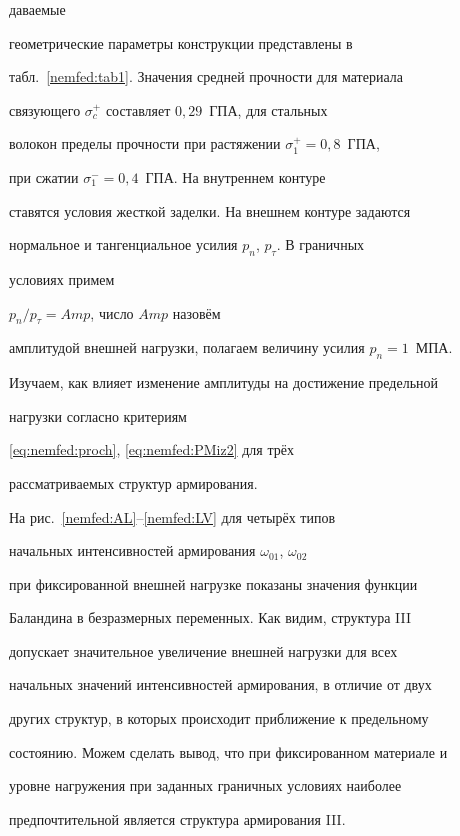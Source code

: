 \noindent даваемые

геометрические параметры конструкции представлены в

табл.~\ref{nemfed:tab1}. Значения средней прочности  для материала

связующего $\sigma_{c}^{+}$ составляет $0,29$~ГПА, для стальных

волокон пределы прочности при растяжении $\sigma_{1}^{+}=0,8$~ГПА,

при сжатии  $\sigma_{1}^{-}=0,4$~ГПА. На внутреннем контуре

ставятся условия жесткой заделки. На внешнем контуре задаются

нормальное и тангенциальное усилия $p_n$, $p_\tau$. В граничных

условиях примем 

 ${p_n}/{p_\tau}=Amp$, число $Amp $ назовём

амплитудой внешней нагрузки, полагаем величину усилия $p_n=1$~МПА.

Изучаем, как влияет изменение амплитуды на достижение предельной

нагрузки согласно критериям

\eqref{eq:nemfed:proch}, \eqref{eq:nemfed:PMiz2} для трёх

рассматриваемых структур армирования.













На рис.~\ref{nemfed:AL}--\ref{nemfed:LV} для четырёх типов

начальных интенсивностей армирования $\omega_{01}$, $\omega_{02}$

при фиксированной внешней нагрузке показаны значения функции

Баландина  в безразмерных переменных. Как видим, структура III

допускает значительное увеличение внешней нагрузки для всех

начальных значений интенсивностей армирования, в отличие от двух

других структур, в которых происходит приближение к предельному

состоянию.  Можем сделать вывод, что при фиксированном материале и

уровне нагружения  при заданных граничных условиях наиболее

предпочтительной является структура армирования III.











